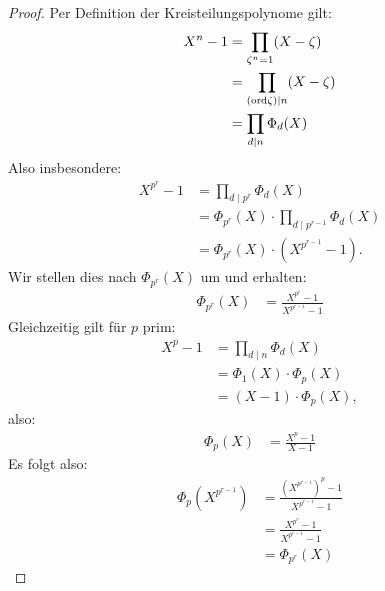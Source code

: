 \documentclass{article}
\begin{document}
		\begin{proof}
			Per Definition der Kreisteilungspolynome gilt:
			\begin{align*}
				X^n - 1 
				&= \prod_{\zeta^n = 1} (X - \zeta)\\
				&= \prod_{(\textnormal{ord} \zeta) \mid n} (X - \zeta)\\
				&= \prod_{d \mid n} \Phi_d(X)
			\end{align*}
			Also insbesondere:
			\begin{align*}
				X^{p^r} - 1 
				&= \prod_{d \mid p^r} \Phi_d(X)\\
				&= \Phi_{p^r}(X) \cdot \prod_{d \mid p^{r-1}} \Phi_d(X)\\
				&= \Phi_{p^r}(X) \cdot (X^{p^{r-1}} - 1).
			\end{align*}
			Wir stellen dies nach $\Phi_{p^r}(X)$ um und erhalten:
			\begin{align*}
				\Phi_{p^r}(X) &= \frac{X^{p^r} - 1}{X^{p^{r-1}} - 1}
			\end{align*}
			Gleichzeitig gilt für $p$ prim:
			\begin{align*}
				X^p - 1 
				&= \prod_{d \mid n} \Phi_d(X)\\
				&= \Phi_1(X) \cdot \Phi_p(X)\\
				&= (X - 1) \cdot \Phi_p(X),
			\end{align*}
			also:
			\begin{align*}
				\Phi_p(X) &= \frac{X^p - 1}{X - 1}
			\end{align*}
			Es folgt also:
			\begin{align*}
				\Phi_p(X^{p^{r-1}}) 
				&= \frac{(X^{p^{r-1}})^p - 1}{X^{p^{r-1}} - 1}\\
				&= \frac{X^{p^{r}} - 1}{X^{p^{r-1}} - 1}\\
				&= \Phi_{p^r}(X)
			\end{align*}
		\end{proof}
	\clearpage
\end{document}
